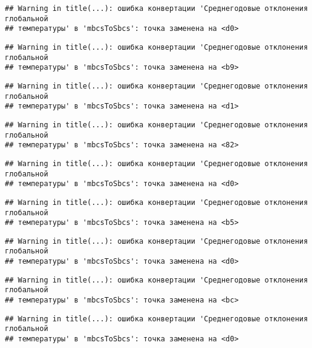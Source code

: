 \documentclass[
]{article}
\begin{document}
\begin{verbatim}
## Warning in title(...): ошибка конвертации 'Среднегодовые отклонения глобальной
## температуры' в 'mbcsToSbcs': точка заменена на <d0>
\end{verbatim}

\begin{verbatim}
## Warning in title(...): ошибка конвертации 'Среднегодовые отклонения глобальной
## температуры' в 'mbcsToSbcs': точка заменена на <b9>
\end{verbatim}

\begin{verbatim}
## Warning in title(...): ошибка конвертации 'Среднегодовые отклонения глобальной
## температуры' в 'mbcsToSbcs': точка заменена на <d1>
\end{verbatim}

\begin{verbatim}
## Warning in title(...): ошибка конвертации 'Среднегодовые отклонения глобальной
## температуры' в 'mbcsToSbcs': точка заменена на <82>
\end{verbatim}

\begin{verbatim}
## Warning in title(...): ошибка конвертации 'Среднегодовые отклонения глобальной
## температуры' в 'mbcsToSbcs': точка заменена на <d0>
\end{verbatim}

\begin{verbatim}
## Warning in title(...): ошибка конвертации 'Среднегодовые отклонения глобальной
## температуры' в 'mbcsToSbcs': точка заменена на <b5>
\end{verbatim}

\begin{verbatim}
## Warning in title(...): ошибка конвертации 'Среднегодовые отклонения глобальной
## температуры' в 'mbcsToSbcs': точка заменена на <d0>
\end{verbatim}

\begin{verbatim}
## Warning in title(...): ошибка конвертации 'Среднегодовые отклонения глобальной
## температуры' в 'mbcsToSbcs': точка заменена на <bc>
\end{verbatim}

\begin{verbatim}
## Warning in title(...): ошибка конвертации 'Среднегодовые отклонения глобальной
## температуры' в 'mbcsToSbcs': точка заменена на <d0>
\end{verbatim}
\end{document}
